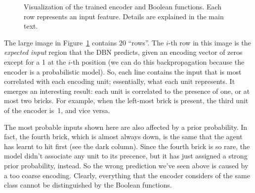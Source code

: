 \begin{figure}[tb]
	\caption{Visualization of the trained encoder and Boolean functions. Each
	row represents an input feature. Details are explained in the main text.}
	\label{fig:breakout-model-all}
\end{figure}
The large image in Figure~\ref{fig:breakout-model-all} contains 20 ``rows''.
The $i$-th row in this image is the \emph{expected input} region that the DBN
predicts, given an encoding vector of zeros except for a 1 at the $i$-th
position (we can do this backpropagation because the encoder is a
probabilistic model). So, each line contains the input that is most
correlated with each encoding unit; essentially, what each unit represents.
It emerges an interesting result: each unit is correlated to the presence of
one, or at most two bricks. For example, when the left-most brick is present,
the third unit of the encoder is~1, and vice versa.

The most probable inputs shown here are also affected by a prior probability.
In fact, the fourth brick, which is almost always down, is the same that the
agent has learnt to hit first (see the dark column). Since the fourth brick is
so rare, the model didn't associate any unit to its precence, but it has just
assigned a strong prior probability, instead. So the wrong prediction we've
seen above is caused by a too coarse encoding. Clearly, everything that the
encoder considers of the same class cannot be distinguished by the Boolean
functions.

